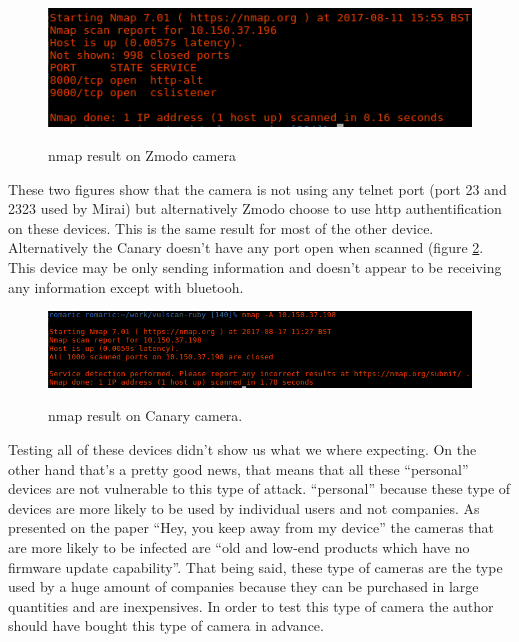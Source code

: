 \documentclass{report}
\begin{document}
\begin{figure}[h]
 \caption{nmap result on Zmodo camera}
 \centering
 \includegraphics[width=1.2\textwidth]{./img/exp/resultelse}
 \label{fig:resultelse-zm}
\end{figure}
These two figures show that the camera is not using any telnet port (port 23 and 2323 used by Mirai) but alternatively Zmodo choose to use http authentification on these devices. This is the same result for most of the other device.\newline
Alternatively the Canary doesn't have any port open when scanned (figure \ref{fig:canary}. This device may be only sending information and doesn't appear to be receiving any information except with bluetooh.
\newpage
\begin{figure}[h]
 \caption{nmap result on Canary \protect\footnotemark camera.}
 \centering
 \includegraphics[width=1.2\textwidth]{./img/exp/canary}
 \label{fig:canary}
\end{figure}


Testing all of these devices didn't show us what we where expecting. On the other hand that's a pretty good news, that means that all these ``personal'' devices are not vulnerable to this type of attack. ``personal'' because these type of devices are more likely to be used by individual users and not companies. As presented on the paper ``Hey, you keep away from my device'' \autocite{cao2017hey} the cameras that are more likely to be infected are ``old and low-end products which have no firmware update capability''. That being said, these type of cameras are the type used by a huge amount of companies because they can be purchased in large quantities and are inexpensives. In order to test this type of camera the author should have bought this type of camera in advance.
\end{document}
